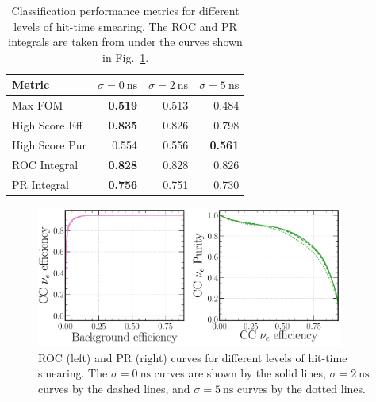 \begin{table} %
    \begin{tabular}{lrrr}
        Metric         & $\sigma=0~\text{ns}$ & $\sigma=2~\text{ns}$ & $\sigma=5~\text{ns}$ \\
        \midrule
        Max FOM        & \textbf{0.519}       & 0.513                & 0.484                \\
        High Score Eff & \textbf{0.835}       & 0.826                & 0.798                \\
        High Score Pur & 0.554                & 0.556                & \textbf{0.561}       \\
        ROC Integral   & \textbf{0.828}       & 0.828                & 0.826                \\
        PR Integral    & \textbf{0.756}       & 0.751                & 0.730                \\
    \end{tabular}
    \caption[Classification performance metrics for different levels of hit-time smearing]
    {Classification performance metrics for different levels of hit-time smearing. The ROC and PR
        integrals are taken from under the curves shown in
        Fig.~\ref{fig:calib_time_nuel_comp_curves}.}
    \label{tab:calib_time}
\end{table}

\begin{figure} %
    \includegraphics[width=0.9\textwidth]{diagrams/7-results/calib_time_nuel_comp_curves.pdf}
    \caption[Receiver operating characteristic and precision-recall curves for different levels of
        hit-time smearing] {ROC (left) and PR (right) curves for different levels of hit-time
        smearing. The $\sigma=0~\text{ns}$ curves are shown by the solid lines,
        $\sigma=2~\text{ns}$ curves by the dashed lines, and $\sigma=5~\text{ns}$ curves by the
        dotted lines.}
    \label{fig:calib_time_nuel_comp_curves}
\end{figure}


